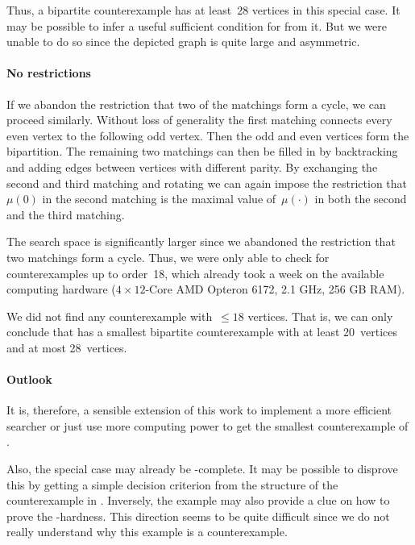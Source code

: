 Thus, a bipartite counterexample has at 
least~28 vertices in this special case. It may be possible
to infer a useful sufficient condition for \probThreeMatching from it. But
we were unable to do so since the depicted graph is quite large and asymmetric.



\paragraph{No restrictions}

If we abandon the restriction that two of the matchings form a cycle, we can proceed similarly. 
Without loss of generality the first matching connects every even vertex to the following odd
vertex. Then the odd and even vertices form the bipartition. The remaining two matchings
can then be filled in by backtracking and adding edges between vertices with different parity. By exchanging
the second and third matching and rotating we can again impose the restriction that~$\mu(0)$
in the second matching is the maximal value of~$\mu(\cdot)$ in both the second and the third matching.

The search space is significantly larger since we abandoned the restriction that two
matchings form a cycle. Thus, we were only able to check for counterexamples up to order~18, which already took a week on the available computing hardware ($4\times12$-Core AMD Opteron 6172, 2.1 GHz, 256 GB RAM). %

We did not find any counterexample with~$\leq 18$ vertices.
That is, we can only conclude that \probThreeMatching
has a smallest bipartite counterexample with at least 20~vertices and at most 28~vertices.

\paragraph{Outlook}

It is, therefore, a sensible extension of this work to implement a
more efficient searcher or just use more computing power to get the
smallest counterexample of \probThreeMatching. 

Also, the special case \probThreeMatching may already be \NP-complete.
It may be possible
to  disprove this by getting a simple decision criterion 
from the structure of the counterexample in .
Inversely, the example may also provide a clue on how to prove the \NP-hardness. This
direction seems to be quite difficult since we do not really understand why this example is a counterexample.